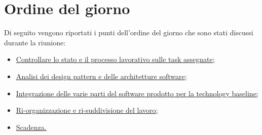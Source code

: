 \clearpage
\section{Ordine del giorno}
Di seguito vengono riportati i punti dell’ordine del giorno che sono stati discussi durante la riunione:
\begin{itemize}
	\item \hyperref[sec:controllo_processo]{Controllare lo stato e il processo lavorativo sulle task assegnate;}
	\item \hyperref[sec:analisi_dp]{Analisi dei design pattern e delle architetture software;}
	\item \hyperref[sec:integrazione]{Integrazione delle varie parti del software prodotto per la technology baseline;}
	\item \hyperref[sec:organizzazione]{Ri-organizzazione e ri-suddivisione del lavoro;}
	\item \hyperref[sec:scadenza]{Scadenza.}
\end{itemize}
